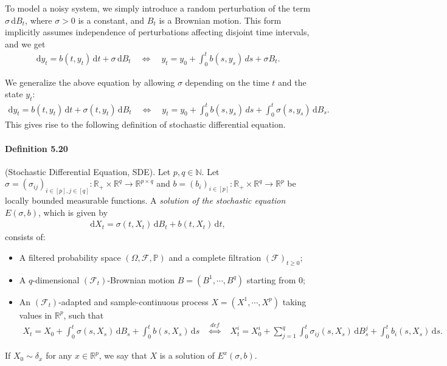 \documentclass{article}
\numberwithin{equation}{section}
\renewcommand{\P}{\mathbb{P}}
\renewcommand{\d}{\mathrm{d}}
\theoremstyle{plain}
\theoremstyle{definition}
\begin{document}
To model a noisy system, we simply introduce a random perturbation of the term $\sigma\,\d B_t$, where $\sigma>0$ is a constant, and $B_t$ is a Brownian motion. This form implicitly assumes independence of perturbations affecting disjoint time intervals, and we get
\begin{align*}
	\d y_t = b(t,y_t)\,\d t + \sigma\,\d B_t\quad\Leftrightarrow\quad y_t = y_0 + \int_0^t b(s,y_s)\,ds + \sigma B_t.
\end{align*}

We generalize the above equation by allowing $\sigma$ depending on the time $t$ and the state $y_t$:
\begin{align*}
	\d y_t = b(t,y_t)\,\d t + \sigma(t,y_t)\,\d B_t\quad\Leftrightarrow\quad y_t = y_0 + \int_0^t b(s,y_s)\,ds + \int_0^t\sigma(s,y_s)\,\d B_s.
\end{align*}
This gives rise to the following definition of stochastic differential equation.

\paragraph{Definition 5.20\label{def:5.20}} (Stochastic Differential Equation, SDE). Let $p,q\in\mathbb{N}$. Let $\sigma=(\sigma_{ij})_{i\in[p],j\in[q]}:\mathbb{R}_+\times\mathbb{R}^q\to\mathbb{R}^{p\times q}$ and $b=(b_i)_{i\in[p]}:\mathbb{R}_+\times\mathbb{R}^q\to\mathbb{R}^p$ be locally bounded measurable functions. A \textit{solution of the stochastic equation} $E(\sigma,b)$, which is given by
\begin{align*}
	\d X_t = \sigma(t,X_t)\,\d B_t + b(t,X_t)\,\d t,
\end{align*}
consists of:
\begin{itemize}
	\item A filtered probability space $(\Omega,\mathscr{F},\P)$ and a complete filtration $(\mathscr{F})_{t\geq 0}$;
	\item A $q$-dimensional $(\mathscr{F}_t)$-Brownian motion $B=(B^1,\cdots,B^q)$ starting from $0$;
	\item An $(\mathscr{F}_t)$-adapted and sample-continuous process $X=(X^1,\cdots,X^p)$ taking values in $\mathbb{R}^p$, such that
	\begin{align*}
		X_t = X_0 + \int_0^t\sigma(s,X_s)\,\d B_s + \int_0^t b(s,X_s)\,\d s\quad\overset{def}{\Leftrightarrow}\quad X_t^i = X_0^i + \sum_{j=1}^q\int_0^t\sigma_{ij}(s,X_s)\,\d B_s^j + \int_0^t b_i(s,X_s)\,\d s.
	\end{align*}
\end{itemize}
If $X_0\sim\delta_x$ for any $x\in\mathbb{R}^p$, we say that $X$ is a solution of $E^x(\sigma,b)$.
\end{document}
